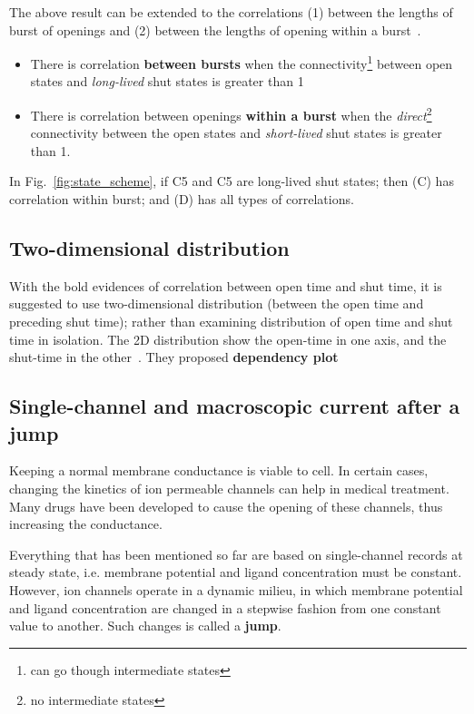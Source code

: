 The above result can be extended to the correlations (1) between the
lengths of burst of openings and (2) between the lengths of opening
within a burst~\citep{colquhoun1987ncs}.
\begin{itemize}
\item There is correlation {\bf between bursts} when the
  connectivity\footnote{can go though intermediate states} between
  open states and {\it long-lived} shut states is greater than 1
\item There is correlation between openings {\bf within a burst} when
  the {\it direct}\footnote{no intermediate states} connectivity
  between the open states and {\it short-lived} shut states is greater
  than 1.
\end{itemize}
In Fig.~\ref{fig:state_scheme}, if C5 and C5 are long-lived shut
states; then (C) has correlation within burst; and (D) has all types
of correlations.

\subsection{Two-dimensional distribution}
\label{sec:two-dimens-distr}

With the bold evidences of correlation between open time and shut
time, it is suggested to use two-dimensional distribution (between the
open time and preceding shut time); rather than examining distribution
of open time and shut time in isolation.  The 2D distribution show the
open-time in one axis, and the shut-time in the
other~\citep{magleby1992dps}. They proposed {\bf dependency plot}

\subsection{Single-channel and macroscopic current after a jump}
\label{sec:single-chann-macr}


Keeping a normal membrane conductance is viable to cell. In certain
cases, changing the kinetics of ion permeable channels can help in
medical treatment. Many drugs have been developed to cause the opening
of these channels, thus increasing the conductance.

Everything that has been mentioned so far are based on single-channel
records at steady state, i.e. membrane potential and ligand
concentration must be constant. However, ion channels operate in a
dynamic milieu, in which membrane potential and ligand concentration
are changed in a stepwise fashion from one constant value to
another. Such changes is called a {\bf jump}.

